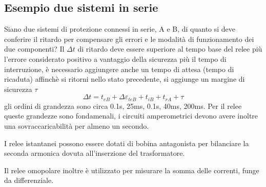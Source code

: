 \subsection{Esempio due sistemi in serie}
Siano due sistemi di protezione connessi in serie, A e B, di quanto si deve conferire il ritardo per compensare gli errori e le modalità di funzionamento dei due componenti? Il $\Delta t$ di ritardo deve essere superiore al tempo base del relee più l'errore considerato positivo a vantaggio della sicurezza più il tempo di interruzione, è necessario aggiungere anche un tempo di attesa (tempo di ricaduta) affinchè si ritorni nello stato precedente, si aggiunge un margine di sicurezza $\tau$
$$
\Delta t = t_{eB} + \Delta\varepsilon_{teB} + t_{iB} + t_{rA} + \tau
$$
gli ordini di grandezza sono circa 0.1s, 25ms, 0.1s, 40ms, 200ms.
Per il relee queste grandezze sono fondamenali, i circuiti amperometrici devono avere inoltre una sovraccaricabilità per almeno un secondo.

I relee istantanei possono essere dotati di bobina antagonista per bilanciare la seconda armonica dovuta all'inserzione del trasformatore.

Il relee omopolare inoltre è utilizzato per misurare la somma delle correnti, funge da differenziale. 